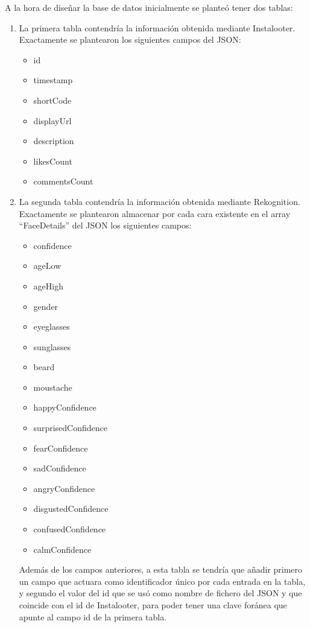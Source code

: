A la hora de diseñar la base de datos inicialmente se planteó tener dos tablas:
\begin{enumerate}
    \item La primera tabla contendría la información obtenida mediante Instalooter. Exactamente se plantearon los siguientes campos del JSON:
    \begin{multicols}{2}
    \begin{itemize}
        \item id
        \item timestamp
        \item shortCode
        \item displayUrl
        \item description
        \item likesCount
        \item commentsCount
    \end{itemize}
    \end{multicols}
    \item La segunda tabla contendría la información obtenida mediante Rekognition. Exactamente se plantearon almacenar por cada cara existente en el array ``FaceDetails'' del JSON los siguientes campos:
    \begin{multicols}{2}
    \begin{itemize}
        \item confidence
        \item ageLow
        \item ageHigh
        \item gender
        \item eyeglasses
        \item sunglasses
        \item beard
        \item moustache
        \item happyConfidence
        \item surprisedConfidence
        \item fearConfidence
        \item sadConfidence
        \item angryConfidence
        \item disgustedConfidence
        \item confusedConfidence
        \item calmConfidence
    \end{itemize}
    \end{multicols}
    Además de los campos anteriores, a esta tabla se tendría que añadir primero un campo que actuara como identificador único por cada entrada en la tabla, y segundo el valor del id que se usó como nombre de fichero del JSON y que coincide con el id de Instalooter, para poder tener una clave foránea que apunte al campo id de la primera tabla.
\end{enumerate}


